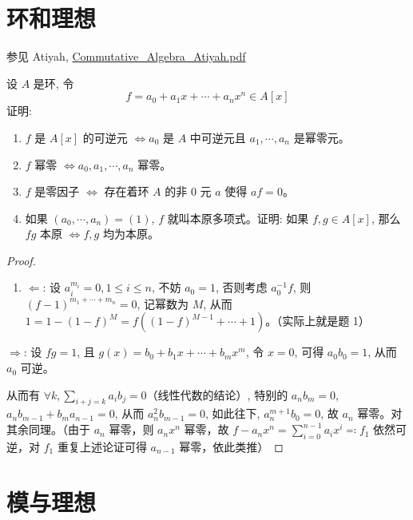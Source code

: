 \section{环和理想}

参见 Atiyah, \href{https://phanpu.github.io/2021/12/26/a-rough-reading-note-for-atiyah-s-commutative-algebra/Commutative_Algebra_Atiyah.pdf}{Commutative\_Algebra\_Atiyah.pdf}

\begin{exercise}
设 $A$ 是环, 令
\[
f = a_{0} + a_{1} x + \cdots + a_{n} x^{n} \in A[x]
\]证明:
	\begin{enumerate}
		\item $f$ 是 $A[x]$ 的可逆元 $\Leftrightarrow a_{0}$ 是 $A$ 中可逆元且 $a_{1}, \cdots, a_{n}$ 是幂零元。
		\item $f$ 幂零 $\Leftrightarrow a_{0}, a_{1}, \cdots, a_{n}$ 幂零。
		\item $f$ 是零因子 $\Leftrightarrow$ 存在着环 $A$ 的非 0 元 $a$ 使得 $a f = 0$。
		\item 如果 $(a_{0}, \cdots, a_{n}) = (1)$, $f$ 就叫本原多项式。证明: 如果 $f, g \in A[x]$, 那么 $f g$ 本原 $\Leftrightarrow f, g$ 均为本原。
	\end{enumerate}
\end{exercise}
\begin{proof}

\begin{enumerate}
	\item $\Leftarrow$: 设 $a_{i}^{m_{i}} = 0, 1 \leq i \leq n$, 不妨 $a_{0} = 1$, 否则考虑 $a_{0}^{-1} f$, 则 $(f-1)^{m_{1}+\cdots+m_{n}} = 0$, 记幂数为 $M$, 从而 $1 = 1-(1-f)^{M} = f((1-f)^{M-1}+\cdots+1)$。（实际上就是题 1）
\end{enumerate}

$\Rightarrow$: 设 $f g = 1$, 且 $g(x) = b_{0}+b_{1} x+\cdots+b_{m} x^{m}$, 令 $x=0$, 可得 $a_{0} b_{0} = 1$, 从而 $a_{0}$ 可逆。

从而有 $\forall k, \sum_{i+j=k} a_{i} b_{j} = 0$（线性代数的结论）, 特别的 $a_{n} b_{m} = 0$, $a_{n} b_{m-1} + b_{m} a_{n-1} = 0$, 从而 $a_{n}^{2} b_{m-1} = 0$, 如此往下, $a_{n}^{m+1} b_{0} = 0$, 故 $a_{n}$ 幂零。对其余同理。（由于 $a_n$ 幂零，则 $a_nx^{n}$ 幂零，故 $f-a_nx^{n}=\sum_{i=0}^{n-1}a_ix^{i}\eqqcolon f_1$ 依然可逆，对 $f_1$ 重复上述论证可得 $a_{n-1}$ 幂零，依此类推）
\end{proof}

\section{模与理想}

